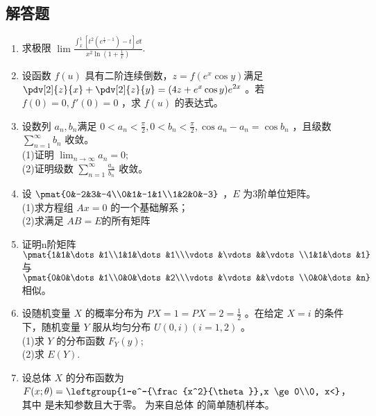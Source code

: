 \subsection{解答题}
\begin{enumerate}
\item 求极限 $\displaystyle \lim \frac{\int_{x}^{1} [t^2(e^{\frac{1}{t}-1})-t]\dd{t}}{x^2\ln(1+\frac{1}{x})}$.
\item 设函数 $f(u)$ 具有二阶连续倒数，$z=f(e^x\cos y)$满足 $\displaystyle \pdv[2]{z}{x}+\pdv[2]{z}{y}=(4z+e^x\cos y)e^{2x}$  。若 $f(0)=0,f'(0)=0$ ，求 $f(u)$ 的表达式。
\item 设数列 ${a_n},{b_n}$满足 $\displaystyle 0<a_n<\frac{\pi}{2},0<b_n<\frac{\pi}{2},\cos a_n-a_n=\cos b_n$ ，且级数 $\displaystyle \sum_{n=1}^\infty b_n$  收敛。\\
(1)证明 $\lim_{n\to\infty} a_n=0;$\\
(2)证明级数 $\displaystyle \sum_{n=1}^\infty \frac{a_n}{b_n}$  收敛。
\item 设 $\pmat{0&-2&3&-4\\0&1&-1&1\\1&2&0&-3}$ ，$ E$  为3阶单位矩阵。\\
(1)求方程组 $Ax=0$ 的一个基础解系；\\
(2)求满足 $AB=E$的所有矩阵 
\item 证明n阶矩阵 $\pmat{1&1&\dots&1\\1&1&\dots&1\\\vdots&\vdots&&\vdots\\1&1&\dots&1}$ 与 $\pmat{0&0&\dots&1\\0&0&\dots&2\\\vdots&\vdots&&\vdots\\0&0&\dots&n}$ 相似。
\item 设随机变量 $X$ 的概率分布为 $P{X=1}=P{X=2}=\frac{1}{2}$ 。在给定 $X=i$ 的条件下，随机变量 $Y$ 服从均匀分布 $U(0,i)(i=1,2)$ 。\\
(1)求 $Y$ 的分布函数 $F_Y(y)$;\\
(2)求 $E(Y)$.
\item 设总体 $X$ 的分布函数为 $\displaystyle F(x;\theta)=\leftgroup{1-e^-{\frac{x^2}{\theta}},x \ge 0\\0, x<}$，其中  是未知参数且大于零。  为来自总体  的简单随机样本。
\end{enumerate}
